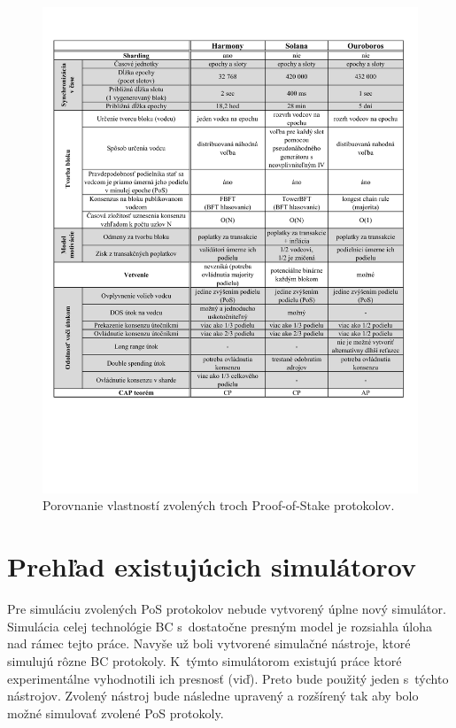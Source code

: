 \begin{figure}[H]
	\centering
	\includegraphics[width=\textwidth]{obrazky-figures/protocol-comparison}
	\caption{Porovnanie vlastností zvolených troch Proof-of-Stake protokolov.}
	\label{img:protocol-comparison}
\end{figure}


\chapter{Prehľad existujúcich simulátorov}\label{chap:simulators-overview}

Pre simuláciu zvolených PoS protokolov nebude vytvorený úplne nový simulátor. Simulácia celej technológie BC s~dostatočne presným model je rozsiahla úloha nad rámec tejto práce. Navyše už boli vytvorené simulačné nástroje, ktoré simulujú rôzne BC protokoly. K~týmto simulátorom existujú práce ktoré experimentálne vyhodnotili ich presnosť (viď\cite{simulatorCompar, fanPerfEval}). Preto bude použitý jeden s~týchto nástrojov. Zvolený nástroj bude následne upravený a rozšírený tak aby bolo možné simulovať zvolené PoS protokoly. 

